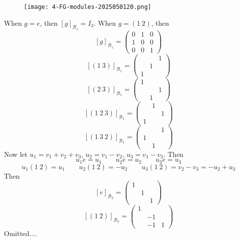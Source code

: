 \begin{exercise}
\begin{figure}[H]
\centering
\texttt{[image: 4-FG-modules-2025050120.png]}
\label{}
\end{figure}
\end{exercise}
When $g=e$, then $[g]_{\mathscr{B}_{1}}=I_3$. When $g=(1\ 2)$, then
\[
[g]_{\mathscr{B}_{1}}=\begin{pmatrix}
0 & 1 & 0 \\
1 & 0 & 0 \\
0 & 0 & 1
\end{pmatrix}
\]
\[
[(1\ 3)]_{\mathscr{B}_{1}}=\begin{pmatrix}
 &  & 1 \\
 & 1  &  \\
1 &  & 
\end{pmatrix}
\]
\[
[(2\ 3)]_{\mathscr{B}_{1}}=\begin{pmatrix}
1 &  &  \\
 &  & 1 \\
 & 1 & 
\end{pmatrix}
\]
\[
[(1\ 2\ 3)]_{\mathscr{B}_{1}}=\begin{pmatrix}
 & 1 &  \\
 &  & 1 \\
1 &  & 
\end{pmatrix}
\]
\[
[(1\ 3\ 2)]_{\mathscr{B}_{1}}=\begin{pmatrix}
 &  & 1 \\
1 &  &  \\
 & 1 &  
\end{pmatrix}
\]
Now let $u_1=v_1+v_2+v_3$, $u_2=v_1-v_2$, $u_3=v_1-v_3$. Then
\[
u_1e=u_1\qquad u_2e=u_2\qquad u_3e=u_3
\]
\[
u_1(1\ 2)=u_1\qquad u_2(1\ 2)=-u_2\qquad u_3(1\ 2)=v_2-v_3=-u_2+u_3
\]
Then
\[
[e]_{\mathscr{B}_{2}}=\begin{pmatrix}
1 &  &  \\
 & 1 &  \\
 &  & 1
\end{pmatrix}
\]
\[
[(1\ 2)]_{\mathscr{B}_{2}}=\begin{pmatrix}
1 &  &  \\
 & -1 &  \\
 & -1 & 1 
\end{pmatrix}
\]
Omitted....

